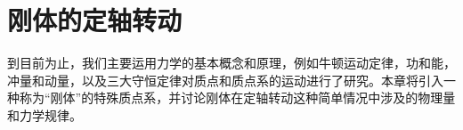 \chapter{刚体的定轴转动}

到目前为止，我们主要运用力学的基本概念和原理，例如牛顿运动定律，功和能，冲量和动量，以及三大守恒定律对质点和质点系的运动进行了研究。本章将引入一种称为“刚体”的特殊质点系，并讨论刚体在定轴转动这种简单情况中涉及的物理量和力学规律。

